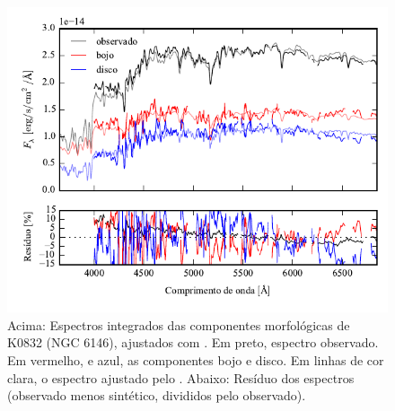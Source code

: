 \begin{figure}
	\includegraphics[page=9]{figuras/sample006a_synthesis}
	\caption[Espectros ajustados com \starlight das componentes morfológicas de
	K0832 (NGC 6146)]
	{Acima: Espectros integrados das componentes morfológicas de
	K0832 (NGC 6146), ajustados com \starlight. Em preto, espectro observado. Em
	vermelho, e azul, as componentes bojo e disco. Em linhas de cor clara, o
	espectro ajustado pelo \starlight. Abaixo: Resíduo dos espectros (observado
	menos sintético, divididos pelo observado).}
	\label{fig:decompSintese:K0832}
\end{figure}

